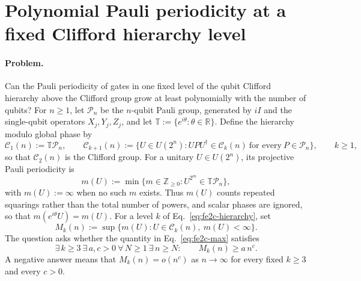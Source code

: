 \section{Polynomial Pauli periodicity at a fixed Clifford hierarchy level}
\label{sec:op_fe2c638b34652717}

\paragraph{Problem.}
Can the Pauli periodicity of gates in one fixed level of the qubit
Clifford hierarchy above the Clifford group grow at least polynomially with the
number of qubits?  For $n\geq1$, let $\mathcal{P}_n$ be the $n$-qubit Pauli
group, generated by $iI$ and the single-qubit operators $X_j,Y_j,Z_j$, and let
$\mathbb{T}:=\{e^{i\theta}:\theta\in\mathbb{R}\}$.  Define the hierarchy modulo
global phase by
\begin{equation}
  \mathcal{C}_1(n):=\mathbb{T}\mathcal{P}_n,
  \qquad
  \mathcal{C}_{k+1}(n):=
  \bigl\{U\in U(2^n):UPU^\dagger\in\mathcal{C}_k(n)
  \ \text{for every}\ P\in\mathcal{P}_n\bigr\},
  \qquad k\geq1,
  \label{eq:fe2c-hierarchy}
\end{equation}
so that $\mathcal{C}_2(n)$ is the Clifford group.  For a unitary
$U\in U(2^n)$, its projective Pauli periodicity is
\begin{equation}
  m(U):=\min\bigl\{m\in\mathbb{Z}_{\geq0}:U^{2^m}\in\mathbb{T}\mathcal{P}_n\bigr\},
  \label{eq:fe2c-periodicity}
\end{equation}
with $m(U):=\infty$ when no such $m$ exists.  Thus $m(U)$ counts repeated
squarings rather than the total number of powers, and scalar phases are
ignored, so that $m(e^{i\theta}U)=m(U)$.  For a level $k$ of
Eq.~\eqref{eq:fe2c-hierarchy}, set
\begin{equation}
  M_k(n):=\sup\bigl\{m(U):U\in\mathcal{C}_k(n),\ m(U)<\infty\bigr\}.
  \label{eq:fe2c-max}
\end{equation}
The question asks whether the quantity in Eq.~\eqref{eq:fe2c-max} satisfies
\begin{equation}
  \exists\,k\geq3\ \exists\,a,c>0\ \forall\,N\geq1\ \exists\,n\geq N:
  \qquad M_k(n)\geq a\,n^{c}.
  \label{eq:fe2c-target}
\end{equation}
A negative answer means that $M_k(n)=o(n^{c})$ as $n\to\infty$ for every fixed
$k\geq3$ and every $c>0$.

